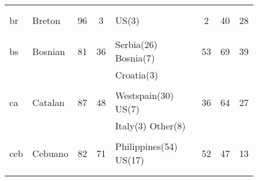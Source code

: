\begin{figure}[h]
\begin{tabular}{llcclccc}
&&&&&&&\\
&&&&&&&\\
br&Breton&96&3&US(3) &2&40&28\\
&&&&&&&\\
&&&&&&&\\
bs&Bosnian&81&36&Serbia(26) Bosnia(7) &53&69&39\\
&&&&Croatia(3) &&&\\
&&&&&&&\\
ca&Catalan&87&48&Westspain(30) US(7) &36&64&27\\
&&&&Italy(3) Other(8) &&&\\
&&&&&&&\\
ceb&Cebuano&82&71&Philippines(54) US(17) &52&47&13\\
&&&&&&&\\
&&&&&&&\\
\end{tabular}
\end{figure}
\clearpage
